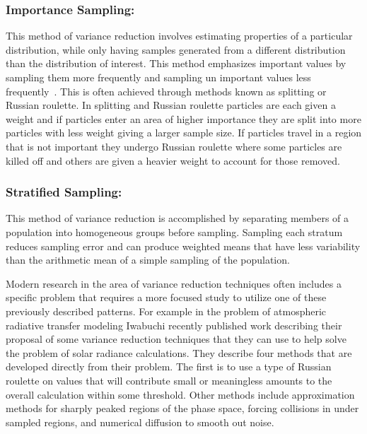 \subsubsection*{Importance Sampling: } This method of variance reduction involves estimating properties of a particular distribution, while only having samples generated from a different distribution than the distribution of interest. This method emphasizes important values by sampling them more frequently and sampling un important values less frequently~\cite{wikipediaImportanceSampling}. This is often achieved through methods known as splitting or Russian roulette. In splitting and Russian roulette particles are each given a weight and if particles enter an area of higher importance they are split into more particles with less weight giving a larger sample size. If particles travel in a region that is not important they undergo Russian roulette where some particles are killed off and others are given a heavier weight to account for those removed.~\cite{melnik2000rare}

\subsubsection*{Stratified Sampling: } This method of variance reduction is accomplished by separating members of a population into homogeneous groups before sampling. Sampling each stratum reduces sampling error and can produce weighted means that have less variability than the arithmetic mean of a simple sampling of the population. ~\cite{wikipediaStratifiedSampling}

Modern research in the area of variance reduction techniques often includes a specific problem that requires a more focused study to utilize one of these previously described patterns.
%
For example in the problem of atmospheric radiative transfer modeling Iwabuchi recently published work describing their proposal of some variance reduction techniques that they can use to help solve the problem of solar radiance calculations.
%
They describe four methods that are developed directly from their problem.
%
The first is to use a type of Russian roulette on values that will contribute small or meaningless amounts to the overall calculation within some threshold.
%
Other methods include approximation methods for sharply peaked regions of the phase space, forcing collisions in under sampled regions, and numerical diffusion to smooth out noise.~\cite{iwabuchi2015efficient}
 